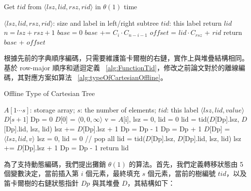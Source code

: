 \documentclass{gapd}
\begin{document}
\begin{algorithm*}
  \caption{Get $tid$ from $\langle\mathit{lsz},\mathit{lid},\mathit{rsz},\mathit{rid}\rangle$ in $\theta(1)$ time}
  \label{alg:FunctionTid}
  \begin{algorithmic}[1]
    \Require
      $\langle\mathit{lsz},\mathit{lid},\mathit{rsz},\mathit{rid}\rangle$: size and label in left/right subtree
    \Ensure
      $\mathit{tid}$: this label
      \State return $\mathit{lid}$
    \EndIf
    \State $n = \mathit{lsz}+\mathit{rsz}+1$
    \State $\mathit{base} = 0$
      \State $\mathit{base}$ += $C_i \cdot C_{n-i-1}$
    \EndFor
    \State $\mathit{offset}$ = $\mathit{lid} \cdot C_{\mathit{rsz}}$ + $\mathit{rid}$
    \State return $\mathit{base}$ + $\mathit{offset}$
  \end{algorithmic}
\end{algorithm*}

根據先前的字典順序編碼，只需要維護笛卡爾樹的右鏈，實作上與堆疊結構相同。基於 row-major 順序和遞迴定義 ~\ref{alg:FunctionTid}，修改之前論文對於的離線編碼，其對應方案如算法 ~\ref{alg:typeOfCartesianOffline}。

\begin{algorithm*}
  \caption{Offline Type of Cartesian Tree}
  \label{alg:typeOfCartesianOffline}
  \begin{algorithmic}[1]
    \Require
      $A[1 \cdots s]$: storage array;
      $s$: the number of elements;
    \Ensure
      $\mathit{tid}$: this label
    \State $\langle\mathit{lsz},\mathit{lid},\mathit{value}\rangle$ $D$[$s+1$]
    \State Dp = 0
    \State $D$[0] = $\langle0,0,\infty\rangle$
      \State v = $A$[i], lsz = 0, lid = 0
        \State lid = tid($D$[Dp].lsz, $D$[Dp].lid, lsz, lid)
        \State lsz += $D$[Dp].lsz + 1
        \State Dp = Dp - 1
      \EndWhile
      \State Dp = Dp + 1
      \State $D$[Dp] = $\langle\mathit{lsz},\mathit{lid},\mathit{v}\rangle$
    \EndFor
    \State lsz = 0, lid = 0
     // pop all
      \State lid = tid($D$[Dp].lsz, $D$[Dp].lid, lsz, lid)
      \State lsz += $D$[Dp].lsz + 1
      \State Dp = Dp - 1
    \EndWhile
    return lid
  \end{algorithmic}
\end{algorithm*}

為了支持動態編碼，我們提出攤銷 $\theta(1)$ 的算法。首先，我們定義轉移狀態由 5 個變數決定，當前插入第 $i$ 個元素，最終填充 $s$ 個元素，當前的樹編號 $\mathit{tid}$，以及笛卡爾樹的右鏈狀態指針 $Dp$ 與其堆疊 $D$，其結構如下：
\end{document}
